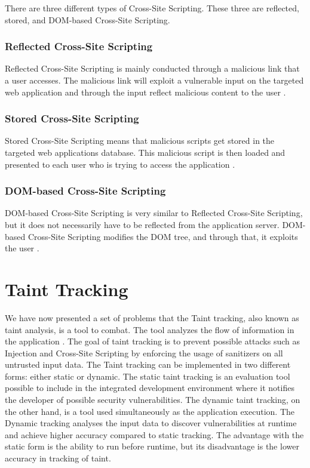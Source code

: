 There are three different types of Cross-Site Scripting. These three are reflected, stored, and DOM-based Cross-Site Scripting.



\subsubsection{Reflected Cross-Site Scripting}
Reflected Cross-Site Scripting is mainly conducted through a malicious link that a user accesses. The malicious link will exploit a vulnerable input on the targeted web application and through the input reflect malicious content to the user \parencite{Secure_Web}.



\subsubsection{Stored Cross-Site Scripting}
Stored Cross-Site Scripting means that malicious scripts get stored in the targeted web applications database. This malicious script is then loaded and presented to each user who is trying to access the application \parencite{Secure_Web}.



\subsubsection{DOM-based Cross-Site Scripting}
DOM-based Cross-Site Scripting is very similar to Reflected Cross-Site Scripting, but it does not necessarily have to be reflected from the application server. DOM-based Cross-Site Scripting modifies the DOM tree, and through that, it exploits the user \parencite{Secure_Web}.



\section{Taint Tracking}
\label{DynamicTaintTracking}
We have now presented a set of problems that the Taint tracking, also known as taint analysis, is a tool to combat. The tool analyzes the flow of information in the application \parencite{Pan2015}. The goal of taint tracking is to prevent possible attacks such as Injection and Cross-Site Scripting by enforcing the usage of sanitizers on all untrusted input data. The Taint tracking can be implemented in two different forms: either static or dynamic. The static taint tracking is an evaluation tool possible to include in the integrated development environment where it notifies the developer of possible security vulnerabilities. The dynamic taint tracking, on the other hand, is a tool used simultaneously as the application execution. The Dynamic tracking analyses the input data to discover vulnerabilities at runtime and achieve higher accuracy compared to static tracking. The advantage with the static form is the ability to run before runtime, but its disadvantage is the lower accuracy in tracking of taint.

